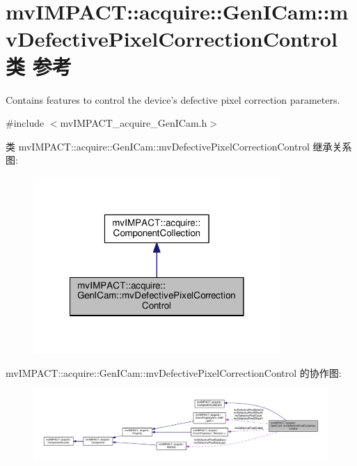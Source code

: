 \hypertarget{classmv_i_m_p_a_c_t_1_1acquire_1_1_gen_i_cam_1_1mv_defective_pixel_correction_control}{\section{mv\+I\+M\+P\+A\+C\+T\+:\+:acquire\+:\+:Gen\+I\+Cam\+:\+:mv\+Defective\+Pixel\+Correction\+Control类 参考}
\label{classmv_i_m_p_a_c_t_1_1acquire_1_1_gen_i_cam_1_1mv_defective_pixel_correction_control}
}


Contains features to control the device's defective pixel correction parameters.  




{\ttfamily \#include $<$mv\+I\+M\+P\+A\+C\+T\+\_\+acquire\+\_\+\+Gen\+I\+Cam.\+h$>$}



类 mv\+I\+M\+P\+A\+C\+T\+:\+:acquire\+:\+:Gen\+I\+Cam\+:\+:mv\+Defective\+Pixel\+Correction\+Control 继承关系图\+:
\nopagebreak
\begin{figure}[H]
\begin{center}
\leavevmode
\includegraphics[width=266pt]{classmv_i_m_p_a_c_t_1_1acquire_1_1_gen_i_cam_1_1mv_defective_pixel_correction_control__inherit__graph}
\end{center}
\end{figure}


mv\+I\+M\+P\+A\+C\+T\+:\+:acquire\+:\+:Gen\+I\+Cam\+:\+:mv\+Defective\+Pixel\+Correction\+Control 的协作图\+:
\nopagebreak
\begin{figure}[H]
\begin{center}
\leavevmode
\includegraphics[width=350pt]{classmv_i_m_p_a_c_t_1_1acquire_1_1_gen_i_cam_1_1mv_defective_pixel_correction_control__coll__graph}
\end{center}
\end{figure}
